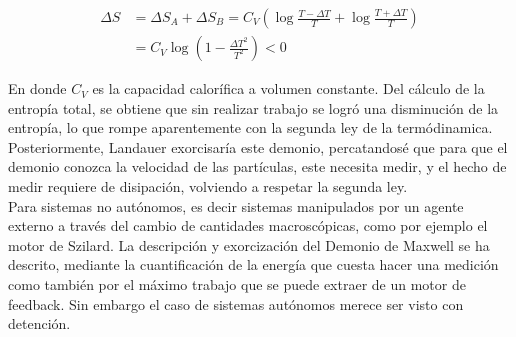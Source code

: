 \begin{align*}
    \Delta S & = \Delta S_{A} + \Delta S_{B} = C_{V}\left( \log \frac{T-\Delta T}{T} + \log \frac{T+\Delta T}{T} \right) \\
       & =  C_{V} \log \left( 1 - \frac{\Delta T^{2}}{T^{2}}  \right) < 0
\end{align*}

En donde $C_{V}$ es la capacidad calorífica a volumen constante. Del cálculo de la entropía total, se obtiene que sin realizar trabajo se logró una disminución de la entropía, lo que rompe aparentemente con la segunda ley de la termódinamica. Posteriormente, Landauer exorcisaría este demonio, percatandosé que para que el demonio conozca la velocidad de las partículas, este necesita medir, y el hecho de medir requiere de  disipación, volviendo a respetar la segunda ley\cite{Landauer_1961}. \\
Para sistemas no autónomos, es decir sistemas manipulados por un agente externo a través del cambio de cantidades macroscópicas, como por ejemplo el motor de Szilard\cite{szilard1964decrease}. La descripción y exorcización del Demonio de Maxwell se ha descrito, mediante la cuantificación de la energía que cuesta hacer una medición como también por el máximo trabajo que se puede extraer de un motor de feedback\cite{maruyama2009colloquium,sagawa2008second}. Sin embargo el caso de sistemas autónomos merece ser visto con detención.


